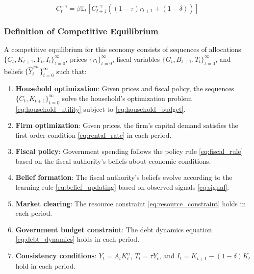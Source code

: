 \documentclass[5p,authoryear]{elsarticle}
\begin{document}
\begin{equation}
C_t^{-\gamma} = \beta \mathbb{E}_t \left[ C_{t+1}^{-\gamma} \left( (1-\tau) r_{t+1} + (1-\delta) \right) \right]
\label{eq:equilibrium_euler}
\end{equation}

\subsubsection{Definition of Competitive Equilibrium}

A competitive equilibrium for this economy consists of sequences of allocations $\{C_t, K_{t+1}, Y_t, I_t\}_{t=0}^{\infty}$, prices $\{r_t\}_{t=0}^{\infty}$, fiscal variables $\{G_t, B_{t+1}, T_t\}_{t=0}^{\infty}$, and beliefs $\{\hat{Y}_t^{gov}\}_{t=0}^{\infty}$ such that:

\begin{enumerate}
\item \textbf{Household optimization}: Given prices and fiscal policy, the sequences $\{C_t, K_{t+1}\}_{t=0}^{\infty}$ solve the household's optimization problem \eqref{eq:household_utility} subject to \eqref{eq:household_budget}.

\item \textbf{Firm optimization}: Given prices, the firm's capital demand satisfies the first-order condition \eqref{eq:rental_rate} in each period.

\item \textbf{Fiscal policy}: Government spending follows the policy rule \eqref{eq:fiscal_rule} based on the fiscal authority's beliefs about economic conditions.

\item \textbf{Belief formation}: The fiscal authority's beliefs evolve according to the learning rule \eqref{eq:belief_updating} based on observed signals \eqref{eq:signal}.

\item \textbf{Market clearing}: The resource constraint \eqref{eq:resource_constraint} holds in each period.

\item \textbf{Government budget constraint}: The debt dynamics equation \eqref{eq:debt_dynamics} holds in each period.

\item \textbf{Consistency conditions}: $Y_t = A_t K_t^{\alpha}$, $T_t = \tau Y_t$, and $I_t = K_{t+1} - (1-\delta) K_t$ hold in each period.
\end{enumerate}
\end{document}
